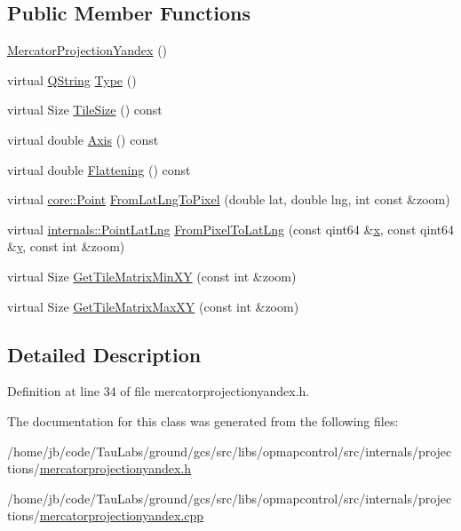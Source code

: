 \subsection*{\-Public \-Member \-Functions}
\begin{DoxyCompactItemize}
\item 
\hyperlink{group___o_p_map_widget_gaebc460c991ff6702512b15ff65b33ece}{\-Mercator\-Projection\-Yandex} ()
\item 
virtual \hyperlink{group___u_a_v_objects_plugin_gab9d252f49c333c94a72f97ce3105a32d}{\-Q\-String} \hyperlink{group___o_p_map_widget_gadfc14a9f761555a7472779402c2c0511}{\-Type} ()
\item 
virtual \-Size \hyperlink{group___o_p_map_widget_ga54a0f175ca8a37d62e27a2a7916ac6f9}{\-Tile\-Size} () const 
\item 
virtual double \hyperlink{group___o_p_map_widget_ga8bcc6388e661bbc92a1fab57579f7364}{\-Axis} () const 
\item 
virtual double \hyperlink{group___o_p_map_widget_gafc15feecfe2d4b87734d398f18a6903b}{\-Flattening} () const 
\item 
virtual \hyperlink{structcore_1_1_point}{core\-::\-Point} \hyperlink{group___o_p_map_widget_ga165e0f0502d73b38e1712e95eeaffb10}{\-From\-Lat\-Lng\-To\-Pixel} (double lat, double lng, int const \&zoom)
\item 
virtual \hyperlink{structinternals_1_1_point_lat_lng}{internals\-::\-Point\-Lat\-Lng} \hyperlink{group___o_p_map_widget_ga05a8dfb0d9ffc159da5776934f61d6ee}{\-From\-Pixel\-To\-Lat\-Lng} (const qint64 \&\hyperlink{_o_p_plots_8m_a9336ebf25087d91c818ee6e9ec29f8c1}{x}, const qint64 \&\hyperlink{_o_p_plots_8m_a2fb1c5cf58867b5bbc9a1b145a86f3a0}{y}, const int \&zoom)
\item 
virtual \-Size \hyperlink{group___o_p_map_widget_gae31d23a05a2c6771d8a5c2557d51f2dc}{\-Get\-Tile\-Matrix\-Min\-X\-Y} (const int \&zoom)
\item 
virtual \-Size \hyperlink{group___o_p_map_widget_ga7ecba9178be61022f6e533b06422a17e}{\-Get\-Tile\-Matrix\-Max\-X\-Y} (const int \&zoom)
\end{DoxyCompactItemize}


\subsection{\-Detailed \-Description}


\-Definition at line 34 of file mercatorprojectionyandex.\-h.



\-The documentation for this class was generated from the following files\-:\begin{DoxyCompactItemize}
\item 
/home/jb/code/\-Tau\-Labs/ground/gcs/src/libs/opmapcontrol/src/internals/projections/\hyperlink{mercatorprojectionyandex_8h}{mercatorprojectionyandex.\-h}\item 
/home/jb/code/\-Tau\-Labs/ground/gcs/src/libs/opmapcontrol/src/internals/projections/\hyperlink{mercatorprojectionyandex_8cpp}{mercatorprojectionyandex.\-cpp}\end{DoxyCompactItemize}

